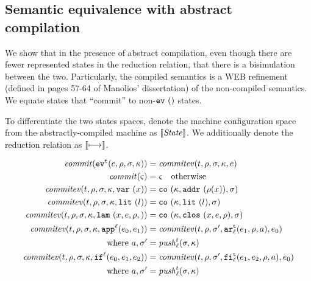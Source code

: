 \documentclass{llncs}
\begin{document}
\subsection{Semantic equivalence with abstract compilation}

We show that in the presence of abstract compilation, even though
there are fewer represented states in the reduction relation, that
there is a bisimulation between the two. Particularly, the compiled
semantics is a WEB refinement (defined in pages 57-64 of Manolios'
dissertation) of the non-compiled semantics. We equate states that
``commit'' to non-$\ev{}$ states.

To differentiate the two states spaces, denote the machine
configuration space from the abstractly-compiled machine as
$\CompState$. We additionally denote the reduction relation as $\cmachstep$.

\begin{align*}
\commit(\ev[^\mcntr]{\mexp,\menv,\msto,\mkont}) &= \commitev(\mcntr,\menv,\msto,\mkont,\mexp) \\
\commit(\mstate) &= \mstate \quad \text{otherwise} \\
\commitev(\mcntr,\menv,\msto,\mkont,\svar{\mvar}) &= \co{\mkont, \spchoice{\saddr{\menv(\mvar)}}{\superposition{\msto(\menv(\mvar))}},\msto} \\
\commitev(\mcntr,\menv,\msto,\mkont,\slit\mlit) &= \co{\mkont,\slit\mlit,\msto} \\
\commitev(\mcntr,\menv,\msto,\mkont,\slam{\mvar,\mexp,\menv}) &= \co{\mkont,\clos{\mvar,\mexp,\menv},\msto} \\
\commitev(\mcntr,\menv,\msto,\mkont,\sapp[^\mlab]{\mexpi0}{\mexpi1}) &=
  \commitev(\mcntr,\menv,\msto',\kar[^\mcntr_\mlab]{\mexpi1, \menv, \maddr},\mexpi0) \\
 \text{ where } \maddr, \msto' &= \push_\mlab^\mcntr(\msto,\mkont) \\
\commitev(\mcntr,\menv,\msto,\mkont,\sif[^\mlab]{\mexpi0}{\mexpi1}{\mexpi2}) &=
  \commitev(\mcntr,\menv,\msto',\kif[^\mcntr_\mlab]{\mexpi1, \mexpi2, \menv, \maddr},\mexpi0) \\
 \text{ where } \maddr, \msto' &= \push_\mlab^\mcntr(\msto,\mkont)
\end{align*}
\end{document}
